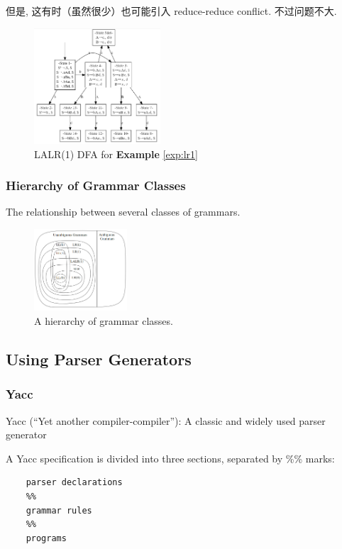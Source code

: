 但是, 这有时（虽然很少）也可能引入 reduce-reduce conflict. 不过问题不大. 

\begin{figure}[!htb]
    \centering
    \includegraphics[width=0.42\textwidth]{pic/CP3/explalr1dfa.png}
    \caption{LALR(1) DFA for \textbf{Example} \ref{exp:lr1}}
\end{figure}

\subsubsection{Hierarchy of Grammar Classes}
The relationship between several classes of grammars. 
\begin{figure}[!htb]
    \centering
    \includegraphics[width=0.309\textwidth]{pic/CP3/A hierarchy of grammar classes.}
    \caption{A hierarchy of grammar classes.}
\end{figure}

\subsection{Using Parser Generators}
\subsubsection{Yacc}
Yacc (``Yet another compiler-compiler''): A classic and widely used parser
generator

A Yacc specification is divided into three sections, separated by \%\% marks:

\begin{verbatim}
    parser declarations
    %%
    grammar rules
    %%
    programs
\end{verbatim}

